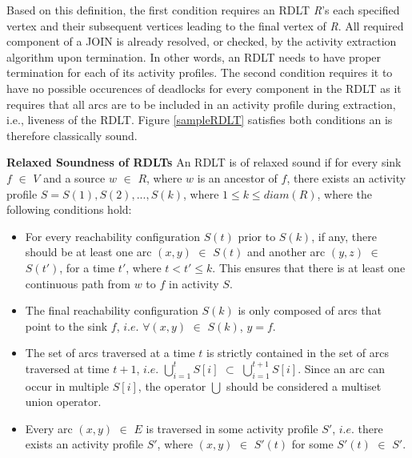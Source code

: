 Based on this definition, the first condition requires an RDLT \emph{R}'s each specified vertex and their subsequent vertices leading to the final vertex of \emph{R}. All required component of a JOIN is already resolved, or checked, by the activity extraction algorithm upon termination. In other words, an RDLT needs to have proper termination for each of its activity profiles. The second condition requires it to have no possible occurences of deadlocks for every component in the RDLT as it requires that all arcs are to be included in an activity profile during extraction, i.e., liveness of the RDLT. Figure \ref{sampleRDLT} satisfies both conditions an is therefore classically sound.

\begin{defn}\textbf{Relaxed Soundness of RDLTs} \cite{Malinao2017, MalinaoPJS2023, Sulla2023}
    \label{RelaxedRDLTDef}
    An RDLT is of relaxed sound if for every sink $ f $ $ \in $ $ V $ and a source $ w $ $ \in $ $ R $, where $ w $ is an ancestor of $ f $, there exists an activity profile $ S = {S(1), S(2), ..., S(k)} $, where $ 1 \leq k \leq diam(R) $, where the following conditions hold:
    \begin{itemize}
        \item For every reachability configuration $ S(t) $ prior to $ S(k) $, if any, there should be at least one arc $ (x,y) $ $ \in $ $ S(t) $ and another arc $ (y,z) $ $ \in $ $ S(t') $, for a time $ t' $, where $ t < t' \leq k $. This ensures that there is at least one continuous path from $ w $ to $ f $ in activity $ S $.
        \item The final reachability configuration $ S(k) $ is only composed of arcs that point to the sink $ f $, $ i.e. $ $ \forall (x,y) $ $ \in $ $ S(k) $, $ y = f $.
        \item The set of arcs traversed at a time $ t $ is strictly contained in the set of arcs traversed at time $ t + 1 $, $ i.e. $ $ \bigcup_{i=1}^{t} S[i] $ $ \subset $ $ \bigcup_{i=1}^{t+1} S[i] $. Since an arc can occur in multiple $ S[i] $, the operator $ \bigcup $ should be considered a multiset union operator.
        \item Every arc $ (x,y) $ $ \in $ $ E $ is traversed in some activity profile $ S' $, $ i.e. $ there exists an activity profile $ S' $, where $ (x,y) $ $ \in $ $ S'(t) $ for some $ S'(t) $ $ \in $ $ S' $.
    \end{itemize}
\end{defn}


